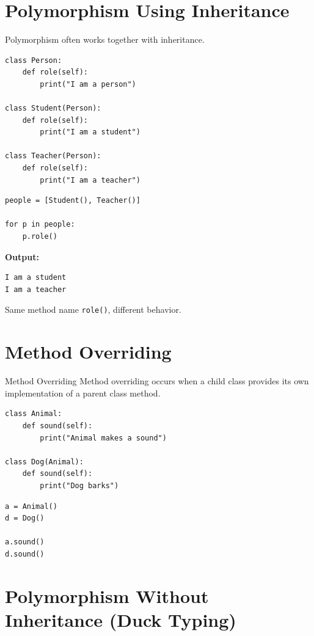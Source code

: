 \section{Polymorphism Using Inheritance}

Polymorphism often works together with inheritance.

\begin{verbatim}
class Person:
    def role(self):
        print("I am a person")

class Student(Person):
    def role(self):
        print("I am a student")

class Teacher(Person):
    def role(self):
        print("I am a teacher")
\end{verbatim}

\begin{verbatim}
people = [Student(), Teacher()]

for p in people:
    p.role()
\end{verbatim}

\textbf{Output:}
\begin{verbatim}
I am a student
I am a teacher
\end{verbatim}

Same method name \texttt{role()}, different behavior.

\section{Method Overriding}

\begin{definition}{Method Overriding}
Method overriding occurs when a child class provides its own implementation of a parent class method.
\end{definition}

\begin{verbatim}
class Animal:
    def sound(self):
        print("Animal makes a sound")

class Dog(Animal):
    def sound(self):
        print("Dog barks")
\end{verbatim}

\begin{verbatim}
a = Animal()
d = Dog()

a.sound()
d.sound()
\end{verbatim}

\section{Polymorphism Without Inheritance (Duck Typing)}

